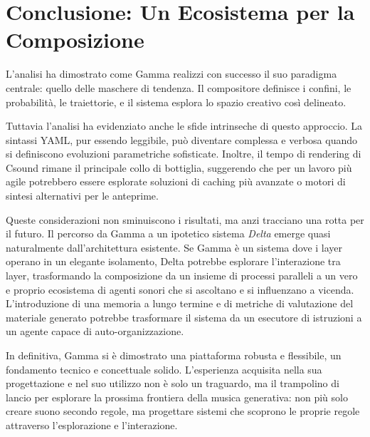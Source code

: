 
\section{Conclusione: Un Ecosistema per la Composizione}
L'analisi ha dimostrato come Gamma realizzi con successo il suo paradigma centrale: quello delle maschere di tendenza. Il compositore definisce i confini, le probabilità, le traiettorie, e il sistema esplora lo spazio creativo così delineato.

Tuttavia l'analisi ha evidenziato anche le sfide intrinseche di questo approccio. La sintassi YAML, pur essendo leggibile, può diventare complessa e verbosa quando si definiscono evoluzioni parametriche sofisticate. Inoltre, il tempo di rendering di Csound rimane il principale collo di bottiglia, suggerendo che per un lavoro più agile potrebbero essere esplorate soluzioni di caching più avanzate o motori di sintesi alternativi per le anteprime.

Queste considerazioni non sminuiscono i risultati, ma anzi tracciano una rotta per il futuro. Il percorso da Gamma a un ipotetico sistema \textit{Delta} emerge quasi naturalmente dall'architettura esistente. Se Gamma è un sistema dove i layer operano in un elegante isolamento, Delta potrebbe esplorare l'interazione tra layer, trasformando la composizione da un insieme di processi paralleli a un vero e proprio ecosistema di agenti sonori che si ascoltano e si influenzano a vicenda. L'introduzione di una memoria a lungo termine e di metriche di valutazione del materiale generato potrebbe trasformare il sistema da un esecutore di istruzioni a un agente capace di auto-organizzazione.

In definitiva, Gamma si è dimostrato una piattaforma robusta e flessibile, un fondamento tecnico e concettuale solido. L'esperienza acquisita nella sua progettazione e nel suo utilizzo non è solo un traguardo, ma il trampolino di lancio per esplorare la prossima frontiera della musica generativa: non più solo creare suono secondo regole, ma progettare sistemi che scoprono le proprie regole attraverso l'esplorazione e l'interazione.